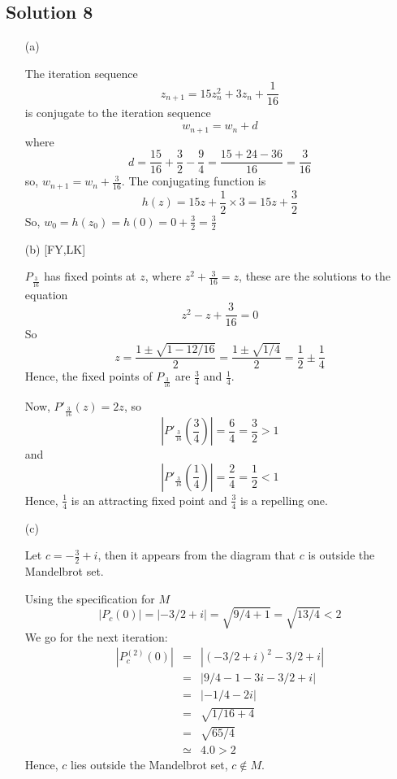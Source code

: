 \subsection*{Solution 8}

\begin{itemize}
\item[(a)]

The iteration sequence
\[
z_{n+1} = 15z_n^2 + 3z_n + \frac{1}{16}
\]
is conjugate to the iteration sequence
\[
w_{n+1} = w_n+d
\]
where
\[
d = \frac{15}{16} + \frac{3}{2} - \frac{9}{4} = \frac{15+24-36}{16} = \frac{3}{16}
\]
so, $w_{n+1} = w_n+\frac{3}{16}$.
The conjugating function is
\[
h(z) = 15z+\frac{1}{2}\times3 = 15z+\frac{3}{2}
\]
So, $w_0 = h(z_0) = h(0) = 0+\frac{3}{2} = \frac{3}{2}$

\item[(b)][FY,LK]

$P_{\frac{3}{16}}$ has fixed points at $z$, where $z^2+\frac{3}{16}=z$,
these are the solutions to the equation
\[
z^2-z+\frac{3}{16} = 0
\]
So
\[
z = \frac{ 1 \pm \sqrt{1 - 12/16} }{ 2 } = \frac{ 1 \pm \sqrt{1/4} }{ 2 } = \frac{1}{2}\pm\frac{1}{4}
\]
Hence, the fixed points of $P_{\frac{3}{16}}$ are $\frac{3}{4}$ and $\frac{1}{4}$.

Now, $P'_{\frac{3}{16}}(z) = 2z$, so
\[ \left|P'_{\frac{3}{16}}\left(\frac{3}{4}\right)\right| = \frac{6}{4} = \frac{3}{2} > 1 \]
and
\[ \left|P'_{\frac{3}{16}}\left(\frac{1}{4}\right)\right| = \frac{2}{4} = \frac{1}{2} < 1 \]
Hence, $\frac{1}{4}$ is an attracting fixed point and $\frac{3}{4}$
is a repelling one.

\item[(c)]

Let $c=-\frac{3}{2}+i$, then it appears from the diagram that $c$ is
outside the Mandelbrot set.

Using the specification for $M$
\[
|P_c(0)| = |-3/2+i| = \sqrt{9/4+1} = \sqrt{13/4} < 2
\]
We go for the next iteration:
\begin{eqnarray*}
|P_c^{(2)}(0)|
	&=& |(-3/2+i)^2-3/2+i| \\
	&=& |9/4-1-3i-3/2+i| \\
	&=& |-1/4-2i| \\
	&=& \sqrt{1/16+4} \\
	&=& \sqrt{65/4} \\
	&\simeq& 4.0 > 2
\end{eqnarray*}
Hence, $c$ lies outside the Mandelbrot set, $c\not\in M$.

\end{itemize}


